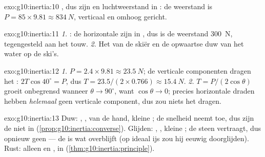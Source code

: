 \begin{solution}{exo:g10:inertia:10}
, dus zijn  en luchtweerstand in
: de weerstand is $P = 85 \times 9.81 \approx \qty{834}{N}$,
verticaal en omhoog gericht.
\end{solution}

\begin{solution}{exo:g10:inertia:11}
\emph{1.} : de horizontale  zijn
in , dus is de weerstand \qty{300}{N}, tegengesteld aan het
touw. \emph{2.} Het  van de skiër en de opwaartse duw van het
water op de ski's.
\end{solution}

\begin{solution}{exo:g10:inertia:12}
\emph{1.} $P = 2.4 \times 9.81 \approx \qty{23.5}{N}$; de verticale
componenten dragen het : $2T\cos 40^\circ = P$, dus
$T = 23.5/(2 \times 0.766) \approx \qty{15.4}{N}$. \emph{2.}
$T = P/(2\cos\theta)$ groeit onbegrensd wanneer $\theta \to 90^\circ$,
want $\cos\theta \to 0$; precies horizontale draden hebben
\emph{helemaal} geen verticale component, dus zou niets het 
dragen.
\end{solution}

\begin{solution}{exo:g10:inertia:13}
Duw: , ,  van de hand, kleine ; de
snelheid neemt toe, dus zijn de  niet in 
(\cref{prop:g10:inertia:converse}). Glijden: , ,
kleine ; de steen vertraagt, dus opnieuw geen  --- de
 is wat overblijft (op ideaal ijs zou hij eeuwig doorglijden).
Rust: alleen  en , in 
(\cref{thm:g10:inertia:principle}).
\end{solution}

